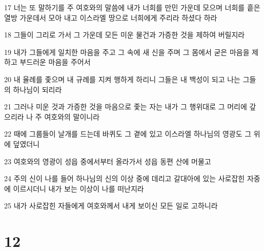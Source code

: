 \par 17 너는 또 말하기를 주 여호와의 말씀에 내가 너희를 만민 가운데 모으며 너희를 흩은 열방 가운데서 모아 내고 이스라엘 땅으로 너희에게 주리라 하셨다 하라
\par 18 그들이 그리로 가서 그 가운데 모든 미운 물건과 가증한 것을 제하여 버릴지라
\par 19 내가 그들에게 일치한 마음을 주고 그 속에 새 신을 주며 그 몸에서 굳은 마음을 제하고 부드러운 마음을 주어서
\par 20 내 율례를 좇으며 내 규례를 지켜 행하게 하리니 그들은 내 백성이 되고 나는 그들의 하나님이 되리라
\par 21 그러나 미운 것과 가증한 것을 마음으로 좇는 자는 내가 그 행위대로 그 머리에 갚으리라 나 주 여호와의 말이니라
\par 22 때에 그룹들이 날개를 드는데 바퀴도 그 곁에 있고 이스라엘 하나님의 영광도 그 위에 덮였더니
\par 23 여호와의 영광이 성읍 중에서부터 올라가서 성읍 동편 산에 머물고
\par 24 주의 신이 나를 들어 하나님의 신의 이상 중에 데리고 갈대아에 있는 사로잡힌 자중에 이르시더니 내가 보는 이상이 나를 떠난지라
\par 25 내가 사로잡힌 자들에게 여호와께서 내게 보이신 모든 일로 고하니라

\chapter{12}

